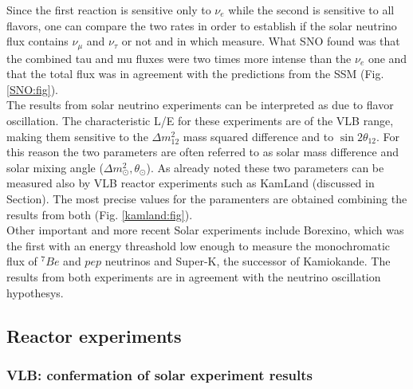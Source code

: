 \documentclass[12pt,a4paper,openright,twoside]{report}
\begin{document}
Since the first reaction is sensitive only to $\nu_e$ while the second is sensitive to all flavors, one can compare the two rates in order to establish if the solar neutrino flux contains $\nu_\mu$ and $\nu_\tau$ or not and in which measure. What SNO found was that the combined tau and mu fluxes were two
times more intense than the $\nu_e$ one and that the total flux was in agreement with the predictions from the SSM (Fig. \ref{SNO:fig}). \\
The results from solar neutrino experiments can be interpreted as due to flavor oscillation. The characteristic L/E for these experiments are of the VLB range, making them sensitive to the $\Delta m^2_{12}$ mass squared difference and to $\sin2\theta_{12}$. For this reason the two parameters are often referred to as solar mass difference and solar mixing angle ($\Delta m^2_\odot, \theta_\odot$). As already noted these two parameters can be measured also by VLB reactor experiments such as KamLand (discussed in Section). The most precise values for the paramenters are obtained combining the results from both (Fig. \ref{kamland:fig}).\\
Other important and more recent Solar experiments include Borexino, which was the first with an energy threashold low enough to measure the monochromatic flux of $^7Be$ and $pep$ neutrinos and Super-K, the successor of Kamiokande. The results from both experiments are in agreement with the neutrino oscillation hypothesys.

\subsection{Reactor experiments}

\subsubsection{VLB: confermation of solar experiment results}
\end{document}
